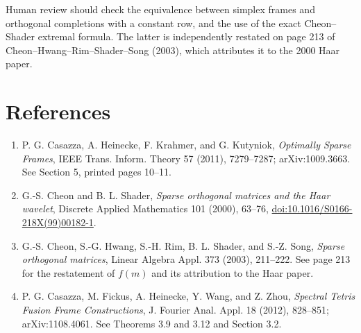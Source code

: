 \documentclass[11pt]{article}
\begin{document}
Human review should check the equivalence between simplex frames and
orthogonal completions with a constant row, and the use of the exact
Cheon--Shader extremal formula.  The latter is independently restated on page
213 of Cheon--Hwang--Rim--Shader--Song (2003), which attributes it to the 2000
Haar paper.

\section*{References}

\begin{enumerate}
\item P. G. Casazza, A. Heinecke, F. Krahmer, and G. Kutyniok,
\emph{Optimally Sparse Frames}, IEEE Trans. Inform. Theory 57 (2011),
7279--7287; arXiv:1009.3663.  See Section 5, printed pages 10--11.

\item G.-S. Cheon and B. L. Shader, \emph{Sparse orthogonal matrices and the
Haar wavelet}, Discrete Applied Mathematics 101 (2000), 63--76,
\href{https://doi.org/10.1016/S0166-218X(99)00182-1}{doi:10.1016/S0166-218X(99)00182-1}.

\item G.-S. Cheon, S.-G. Hwang, S.-H. Rim, B. L. Shader, and S.-Z. Song,
\emph{Sparse orthogonal matrices}, Linear Algebra Appl. 373 (2003),
211--222.  See page 213 for the restatement of $f(m)$ and its attribution to
the Haar paper.

\item P. G. Casazza, M. Fickus, A. Heinecke, Y. Wang, and Z. Zhou,
\emph{Spectral Tetris Fusion Frame Constructions}, J. Fourier Anal. Appl. 18
(2012), 828--851; arXiv:1108.4061.  See Theorems 3.9 and 3.12 and Section 3.2.
\end{enumerate}
\end{document}
